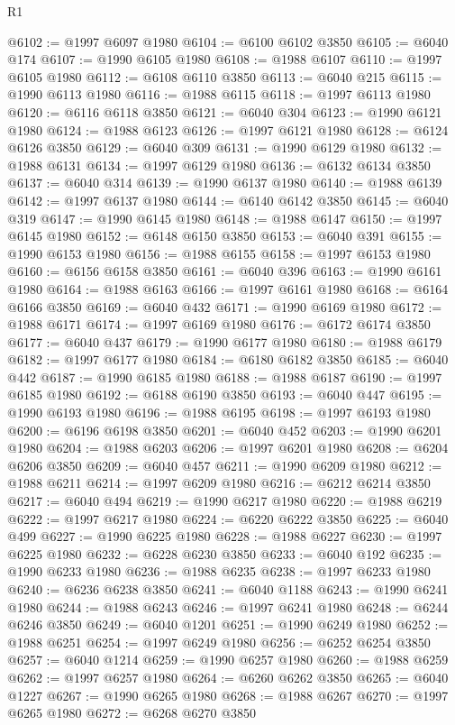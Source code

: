 \begin{lexlean}{R1}
\begin{coremodule}
@6102 := @1997 @6097 @1980
@6104 := @6100 @6102 @3850
@6105 := @6040 @174
@6107 := @1990 @6105 @1980
@6108 := @1988 @6107
@6110 := @1997 @6105 @1980
@6112 := @6108 @6110 @3850
@6113 := @6040 @215
@6115 := @1990 @6113 @1980
@6116 := @1988 @6115
@6118 := @1997 @6113 @1980
@6120 := @6116 @6118 @3850
@6121 := @6040 @304
@6123 := @1990 @6121 @1980
@6124 := @1988 @6123
@6126 := @1997 @6121 @1980
@6128 := @6124 @6126 @3850
@6129 := @6040 @309
@6131 := @1990 @6129 @1980
@6132 := @1988 @6131
@6134 := @1997 @6129 @1980
@6136 := @6132 @6134 @3850
@6137 := @6040 @314
@6139 := @1990 @6137 @1980
@6140 := @1988 @6139
@6142 := @1997 @6137 @1980
@6144 := @6140 @6142 @3850
@6145 := @6040 @319
@6147 := @1990 @6145 @1980
@6148 := @1988 @6147
@6150 := @1997 @6145 @1980
@6152 := @6148 @6150 @3850
@6153 := @6040 @391
@6155 := @1990 @6153 @1980
@6156 := @1988 @6155
@6158 := @1997 @6153 @1980
@6160 := @6156 @6158 @3850
@6161 := @6040 @396
@6163 := @1990 @6161 @1980
@6164 := @1988 @6163
@6166 := @1997 @6161 @1980
@6168 := @6164 @6166 @3850
@6169 := @6040 @432
@6171 := @1990 @6169 @1980
@6172 := @1988 @6171
@6174 := @1997 @6169 @1980
@6176 := @6172 @6174 @3850
@6177 := @6040 @437
@6179 := @1990 @6177 @1980
@6180 := @1988 @6179
@6182 := @1997 @6177 @1980
@6184 := @6180 @6182 @3850
@6185 := @6040 @442
@6187 := @1990 @6185 @1980
@6188 := @1988 @6187
@6190 := @1997 @6185 @1980
@6192 := @6188 @6190 @3850
@6193 := @6040 @447
@6195 := @1990 @6193 @1980
@6196 := @1988 @6195
@6198 := @1997 @6193 @1980
@6200 := @6196 @6198 @3850
@6201 := @6040 @452
@6203 := @1990 @6201 @1980
@6204 := @1988 @6203
@6206 := @1997 @6201 @1980
@6208 := @6204 @6206 @3850
@6209 := @6040 @457
@6211 := @1990 @6209 @1980
@6212 := @1988 @6211
@6214 := @1997 @6209 @1980
@6216 := @6212 @6214 @3850
@6217 := @6040 @494
@6219 := @1990 @6217 @1980
@6220 := @1988 @6219
@6222 := @1997 @6217 @1980
@6224 := @6220 @6222 @3850
@6225 := @6040 @499
@6227 := @1990 @6225 @1980
@6228 := @1988 @6227
@6230 := @1997 @6225 @1980
@6232 := @6228 @6230 @3850
@6233 := @6040 @192
@6235 := @1990 @6233 @1980
@6236 := @1988 @6235
@6238 := @1997 @6233 @1980
@6240 := @6236 @6238 @3850
@6241 := @6040 @1188
@6243 := @1990 @6241 @1980
@6244 := @1988 @6243
@6246 := @1997 @6241 @1980
@6248 := @6244 @6246 @3850
@6249 := @6040 @1201
@6251 := @1990 @6249 @1980
@6252 := @1988 @6251
@6254 := @1997 @6249 @1980
@6256 := @6252 @6254 @3850
@6257 := @6040 @1214
@6259 := @1990 @6257 @1980
@6260 := @1988 @6259
@6262 := @1997 @6257 @1980
@6264 := @6260 @6262 @3850
@6265 := @6040 @1227
@6267 := @1990 @6265 @1980
@6268 := @1988 @6267
@6270 := @1997 @6265 @1980
@6272 := @6268 @6270 @3850

\end{coremodule}
\end{lexlean}

